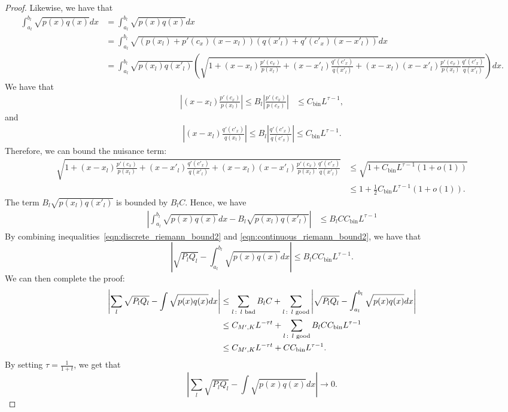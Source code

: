 \documentclass{article}
\newcommand{\bin}{\text{bin}}
\begin{document}
\begin{proof}
Likewise, we have that 
\begin{align*}
\int_{a_l}^{b_l} \sqrt{p(x) q(x)}dx &= \int_{a_l}^{b_l} \sqrt{p(x) q(x)} dx \\
                      &= \int_{a_l}^{b_l} \sqrt{ (p(x_l) + p'(c_x)(x - x_l))
                                      (q(x'_l) + q'(c'_x)(x - x'_l)) } dx \\
    &=\int_{a_l}^{b_l} \sqrt{ p(x_l) q(x'_l)} \left(
              \sqrt{ 1+ (x - x_l) \frac{p'(c_x)}{p(x_l)} + (x - x'_l) \frac{q'(c'_x)}{q(x'_l)} 
                     + (x - x_l)(x - x'_l) \frac{p'(c_x)}{p(x_l)} \frac{q'(c'_x)}{q(x'_l)} } \right) dx. 
\end{align*}
We have that 
\begin{align*}
\left| (x - x_l) \frac{p'(c_x)}{p(x_l)} \right| \leq B_l \left| \frac{ p'(c_x)}{p(c_x)} \right| &\leq C_\bin L^{\tau - 1}, 
\end{align*}
and
\begin{align*}
\left| (x - x_l) \frac{q'(c'_x)}{q(x_l)} \right| \leq B_l \left| \frac{ q'(c'_x)}{q(c'_x)} \right| \leq C_\bin L^{\tau - 1} .
\end{align*}
Therefore, we can bound the nuisance term:
\begin{align*}
 \sqrt{ 1+ (x - x_l) \frac{p'(c_x)}{p(x_l)} + (x - x'_l) \frac{q'(c'_x)}{q(x'_l)} 
                     + (x - x_l)(x - x'_l) \frac{p'(c_x)}{p(x_l)} \frac{q'(c'_x)}{q(x'_l)} } 
    &\leq \sqrt{ 1 + C_\bin L^{\tau - 1} (1 + o(1)) } \\
    &\leq 1 + \frac{1}{2} C_\bin L^{\tau - 1} (1 + o(1)). 
\end{align*}
The term $B_l \sqrt{p(x_l)q(x'_l)}$ is bounded by $B_l C$. Hence, we have
\begin{align}
\label{eqn:continuous_riemann_bound2}
\left| \int_{a_l}^{b_l} \sqrt{p(x) q(x)}dx - B_l \sqrt{p(x_l) q(x'_l)} \right| &\leq B_l C C_\bin L^{\tau - 1}
\end{align}
By combining inequalities~\eqref{eqn:discrete_riemann_bound2} and \eqref{eqn:continuous_riemann_bound2}, we have that
\[
\left| \sqrt{P_l Q_l} - \int_{a_l}^{b_l} \sqrt{p(x) q(x)} dx \right| \leq B_l C C_\bin L^{\tau - 1}.
\]
We can then complete the proof:
\begin{align*}
\left| \sum_l \sqrt{P_l Q_l} - \int \sqrt{p(x) q(x)} dx \right| &\leq
   \sum_{l \,:\, \trm{ $l$ bad}} B_l C + 
   \sum_{l \,:\, \trm{ $l$ good}} \left| \sqrt{P_l Q_l} - \int_{a_l}^{b_l} \sqrt{ p(x) q(x)} dx \right| \\
  & \leq C_{M',K} L^{ - \tau t} + \sum_{l \,:\, \trm{ $l$ good}} B_l C C_\bin L^{\tau - 1} \\
  & \leq  C_{M',K} L^{ - \tau t} + C C_\bin L^{\tau - 1}.
\end{align*}
By setting $\tau = \frac{1}{1+t}$, we get that
\[
\left| \sum_l \sqrt{P_l Q_l} - \int \sqrt{p(x) q(x)} dx \right| \rightarrow 0. 
\]
\end{proof}
\end{document}
